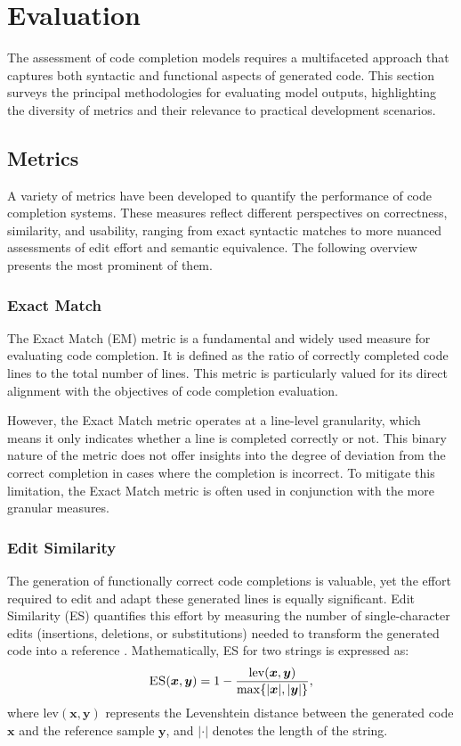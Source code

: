 \section{Evaluation}

The assessment of code completion models requires a multifaceted approach that captures both syntactic and functional aspects of generated code. This section surveys the principal methodologies for evaluating model outputs, highlighting the diversity of metrics and their relevance to practical development scenarios.

\subsection{Metrics}

A variety of metrics have been developed to quantify the performance of code completion systems. These measures reflect different perspectives on correctness, similarity, and usability, ranging from exact syntactic matches to more nuanced assessments of edit effort and semantic equivalence. The following overview presents the most prominent of them.

\subsubsection*{Exact Match}

The Exact Match (EM) metric is a fundamental and widely used measure for evaluating code completion. It is defined as the ratio of correctly completed code lines to the total number of lines. This metric is particularly valued for its direct alignment with the objectives of code completion evaluation.

However, the Exact Match metric operates at a line-level granularity, which means it only indicates whether a line is completed correctly or not. This binary nature of the metric does not offer insights into the degree of deviation from the correct completion in cases where the completion is incorrect. To mitigate this limitation, the Exact Match metric is often used in conjunction with the more granular measures.

\subsubsection*{Edit Similarity}

The generation of functionally correct code completions is valuable, yet the effort required to edit and adapt these generated lines is equally significant. Edit Similarity (ES) quantifies this effort by measuring the number of single-character edits (insertions, deletions, or substitutions) needed to transform the generated code into a reference \parencite{svyatkovskiy2020}. Mathematically, ES for two strings is expressed as:
\begin{equation}
    \text{\textsc{ES}}(\bm{x}, \bm{y}) = 1 - \frac{\mathrm{lev}(\bm{x}, \bm{y})}{\max\{|\bm{x}|, |\bm{y}|\}},
\end{equation}
where \(\mathrm{lev}(\bm{x}, \bm{y})\) represents the Levenshtein distance between the generated code \(\bm{x}\) and the reference sample \(\bm{y}\), and \(|\cdot|\) denotes the length of the string.

